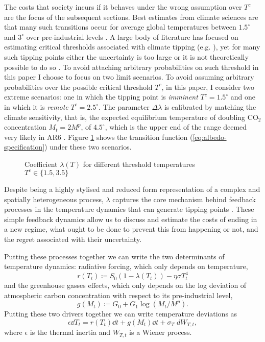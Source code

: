 \documentclass[../../main.tex]{subfiles}
\begin{document}
The costs that society incurs if it behaves under the wrong assumption over $T^c$ are the focus of the subsequent sections. Best estimates from climate sciences are that many such transitions occur for average global temperatures between $1.5^\circ$ and $3^\circ$ over pre-industrial levels \citep{seaver_wang_mechanisms_2023}. A large body of literature has focused on estimating critical thresholds associated with climate tipping (e.g. \citealt{boulton_early_2014,van_westen_physics-based_2024}), yet for many such tipping points either the uncertainty is too large \citep{ben-yami_uncertainties_2024} or it is not theoretically possible to do so \citep{wagener_regime_2013,ditlevsen_tipping_2010}. To avoid attaching arbitrary probabilities on such threshold in this paper I choose to focus on two limit scenarios. To avoid assuming arbitrary probabilities over the possible critical threshold $T^c$, in this paper, I consider two extreme scenarios: one in which the tipping point is \textit{imminent} $T^c = 1.5^\circ$ and one in which it is \textit{remote} $T^c = 2.5^\circ$. The parameter $\Delta\lambda$ is calibrated by matching the climate sensitivity, that is, the expected equilibrium temperature of doubling CO$_2$ concentration $M_t = 2M^p$, of $4.5^\circ$, which is the upper end of the range deemed very likely in AR6 \citep{lee_ipcc_2023}. Figure \ref{fig:albedo_coefficient} shows the transition function (\ref{eq:albedo-specification}) under these two scenarios. \begin{figure}[htbp]
    \centering
    
    \caption{Coefficient $\lambda(T)$ for different threshold temperatures $T^c \in \{1.5, 3.5\}$}
    \label{fig:albedo_coefficient}
\end{figure} Despite being a highly stylised and reduced form representation of a complex and spatially heterogeneous process, $\lambda$ captures the core mechanism behind feedback processes in the temperature dynamics that can generate tipping points \citep{mcguffie_climate_2014}. These simple feedback dynamics allow us to discuss and estimate the costs of ending in a new regime, what ought to be done to prevent this from happening or not, and the regret associated with their uncertainty.

Putting these processes together we can write the two determinants of temperature dynamics: radiative forcing, which only depends on temperature, \begin{equation} \label{eq:forcing}
    r(T_t) \coloneqq S_0 \left(1 - \lambda(T_t)\right) - \eta\sigma T_t^4
\end{equation} and the greenhouse gasses effects, which only depends on the log deviation of atmospheric carbon concentration with respect to its pre-industrial level, \begin{equation}
    g(M_t) \coloneqq G_0 + G_1 \log(M_t / M^p).
\end{equation} Putting these two drivers together we can write temperature deviations as \begin{equation} \label{eq:dynamics:temperature}
    \epsilon \dd{T_t} = r(T_t) \dd{t} + g(M_t) \dd{t} + \sigma_T \; dW_{T, t}, 
\end{equation} where $\epsilon$ is the thermal inertia and $W_{T, t}$ is a Wiener process.
\end{document}

